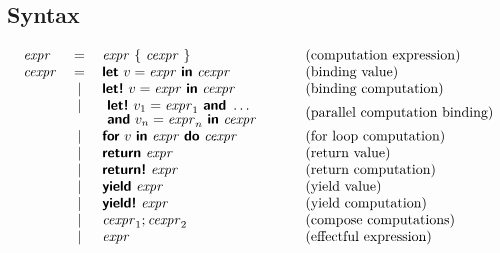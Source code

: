\documentclass[runningheads,a4paper]{llncs}
\begin{document}
\newpage


\subsection{Syntax}
\label{sec:semantics-syntax}

\begin{equation*}
\begin{array}{lclcl}
\expr  &=& \expr ~\{~ \cexpr ~\}                      &\quad&\textnormal{(computation expression)}\\
\cexpr &=& \kvd{let}~v=\expr~\kvd{in}~\cexpr                &&\textnormal{(binding value)} \\
       &|& \kvd{let!}~v=\expr~\kvd{in}~\cexpr               &&\textnormal{(binding computation)} \\
       &\begin{array}{c}|\vspace{1em}\end{array}&\hspace{-0.15em}
           \begin{array}{l}
             \kvd{let!}~v_1=\expr_1~\kvd{and}~\ldots\\[-0.2em]
             \kvd{and}~v_n=\expr_n ~\kvd{in}~\cexpr 
           \end{array}                                      &&\textnormal{(parallel computation binding)} \\
       &|& \kvd{for}~v~\kvd{in}~\expr~\kvd{do}~\cexpr       &&\textnormal{(for loop computation)} \\
       &|& \kvd{return}~\expr                               &&\textnormal{(return value)} \\
       &|& \kvd{return!}~\expr                              &&\textnormal{(return computation)} \\
       &|& \kvd{yield}~\expr                                &&\textnormal{(yield value)} \\
       &|& \kvd{yield!}~\expr                               &&\textnormal{(yield computation)} \\
       &|& \cexpr_1; \cexpr_2                               &&\textnormal{(compose computations)} \\       
       &|& \expr                                            &&\textnormal{(effectful expression)} \\
\end{array}
\end{equation*}
\end{document}
